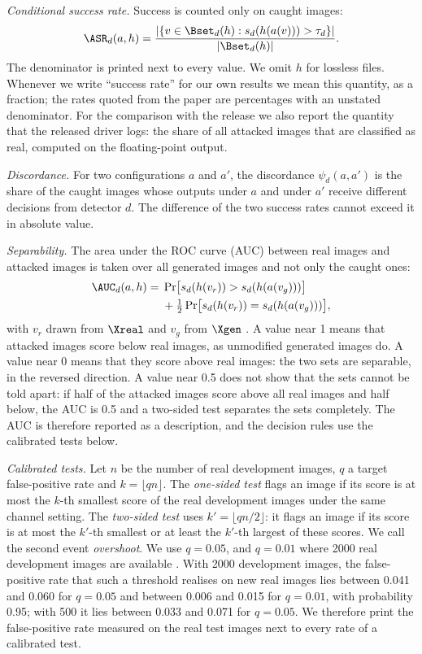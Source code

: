 \emph{Conditional success rate.} Success is counted only on caught images:
\begin{equation}
  \ASR_d(a,h)=\frac{|\{v\in\Bset_d(h) : s_d(h(a(v)))>\tau_d\}|}{|\Bset_d(h)|}.
  \label{eq:asr}
\end{equation}
The denominator is printed next to every value. We omit $h$ for lossless files. Whenever we write
``success rate'' for our own results we mean this quantity, as a fraction; the rates quoted from
the paper are percentages with an unstated denominator. For the comparison with the release we
also report the quantity that the released driver logs: the share of all attacked images that are
classified as real, computed on the floating-point output.

\emph{Discordance.} For two configurations $a$ and $a'$, the discordance $\psi_d(a,a')$ is the
share of the caught images whose outputs under $a$ and under $a'$ receive different decisions from
detector $d$. The difference of the two success rates cannot exceed it in absolute value.

\emph{Separability.} The area under the ROC curve (AUC) between real images and attacked images is
taken over all generated images and not only the caught ones:
\begin{equation}
\begin{aligned}
  \AUC_d(a,h)={}&\Pr\bigl[s_d(h(v_r))>s_d(h(a(v_g)))\bigr]\\
  &+\tfrac12\Pr\bigl[s_d(h(v_r))=s_d(h(a(v_g)))\bigr],
\end{aligned}
  \label{eq:auc}
\end{equation}
with $v_r$ drawn from $\Xreal$ and $v_g$ from $\Xgen$ . A
value near 1 means that attacked images score below real images, as unmodified generated images
do. A value near 0 means that they score above real images: the two sets are separable, in the
reversed direction. A value near 0.5 does not show that the sets cannot be told apart: if half of
the attacked images score above all real images and half below, the AUC is 0.5 and a two-sided test
separates the sets completely. The AUC is therefore reported as a description, and the decision
rules use the calibrated tests below.

\emph{Calibrated tests.} Let $n$ be the number of real development images, $q$ a target
false-positive rate and $k=\lfloor qn\rfloor$. The \emph{one-sided test} flags an image if its
score is at most the $k$-th smallest score of the real development images under the same channel
setting. The \emph{two-sided test} uses $k'=\lfloor qn/2\rfloor$: it flags an image if its score
is at most the $k'$-th smallest or at least the $k'$-th largest of these scores. We call the second
event \emph{overshoot}. We use $q=0.05$, and $q=0.01$ where 2000 real development images are
available . With 2000 development images, the false-positive rate
that such a threshold realises on new real images lies between 0.041 and 0.060 for $q=0.05$ and
between 0.006 and 0.015 for $q=0.01$, with probability 0.95; with 500 it lies between 0.033 and
0.071 for $q=0.05$. We therefore print the false-positive rate measured on the real test images
next to every rate of a calibrated test.

